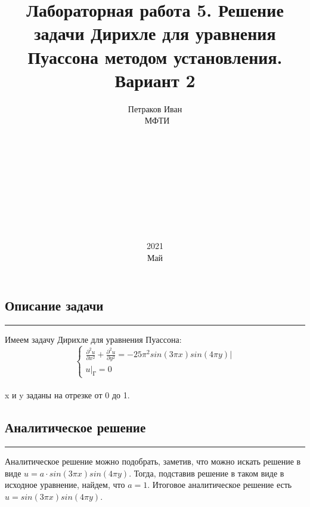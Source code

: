 \documentclass[12pt,a4paper, titlepage]{article}
\title{Лабораторная работа 5. Решение задачи Дирихле для уравнения Пуассона методом установления. Вариант 2}
\date{2021\\Май}
\author{Петраков Иван\\\ МФТИ\\\\\\\\\\\\\\\\\\\\}
\begin{document}
\maketitle

\subsection*{Описание задачи}
\noindent\rule{\textwidth}{1pt}
Имеем задачу Дирихле для уравнения Пуассона:
\begin{equation}
\begin{cases}
\frac{\partial^2u}{\partial x^2} + \frac{\partial^2u}{\partial y^2} = -25 \pi^2 sin(3 \pi x)sin(4 \pi y) |
\\
u|_{\text{Г}} = 0
\end{cases}
\end{equation}
\\
x и y заданы на отрезке от 0 до 1.
\subsection*{Аналитическое решение}
\noindent\rule{\textwidth}{1pt}
Аналитическое решение можно подобрать, заметив, что можно искать решение в виде $u = a\cdot sin(3\pi x)sin(4\pi y)$. Тогда, подставив решение в таком виде в исходное уравнение, найдем, что $a = 1$. Итоговое аналитическое решение есть $u = sin(3\pi x)sin(4\pi y)$.
\end{document}
